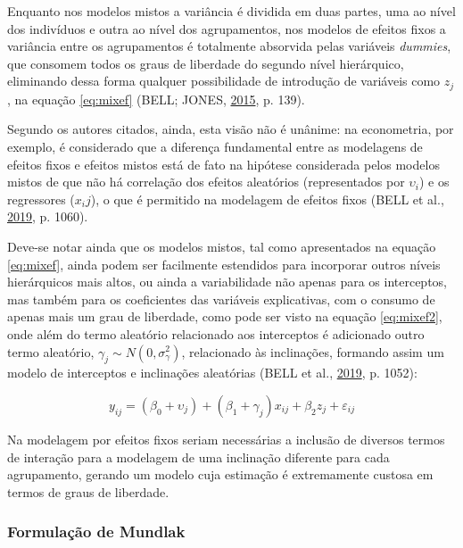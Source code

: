 \documentclass[
  a4paper, 11pt]{article}
\begin{document}
Enquanto nos modelos mistos a variância é dividida em duas partes, uma
ao nível dos indivíduos e outra ao nível dos agrupamentos, nos modelos
de efeitos fixos a variância entre os agrupamentos é totalmente
absorvida pelas variáveis \emph{dummies}, que consomem todos os graus de
liberdade do segundo nível hierárquico, eliminando dessa forma qualquer
possibilidade de introdução de variáveis como \(z_j\), na equação
\ref{eq:mixef} (BELL; JONES, \protect\hyperlink{ref-bell2015}{2015}, p.
139).

Segundo os autores citados, ainda, esta visão não é unânime: na
econometria, por exemplo, é considerado que a diferença fundamental
entre as modelagens de efeitos fixos e efeitos mistos está de fato na
hipótese considerada pelos modelos mistos de que não há correlação dos
efeitos aleatórios (representados por \(\upsilon_i\)) e os regressores
(\(x_ij\)), o que é permitido na modelagem de efeitos fixos (BELL et
al., \protect\hyperlink{ref-bell2019}{2019}, p. 1060).

Deve-se notar ainda que os modelos mistos, tal como apresentados na
equação \ref{eq:mixef}, ainda podem ser facilmente estendidos para
incorporar outros níveis hierárquicos mais altos, ou ainda a
variabilidade não apenas para os interceptos, mas também para os
coeficientes das variáveis explicativas, com o consumo de apenas mais um
grau de liberdade, como pode ser visto na equação \ref{eq:mixef2}, onde
além do termo aleatório relacionado aos interceptos é adicionado outro
termo aleatório, \(\gamma_j \sim N(0, \sigma^2_\gamma)\), relacionado às
inclinações, formando assim um modelo de interceptos e inclinações
aleatórias (BELL et al., \protect\hyperlink{ref-bell2019}{2019}, p.
1052):

\begin{equation} \label{eq:mixef2}
y_{ij} = (\beta_0 + \upsilon_j) + (\beta_1 + \gamma_j) x_{ij} + \beta_2 z_j + \varepsilon_{ij}
\end{equation}

Na modelagem por efeitos fixos seriam necessárias a inclusão de diversos
termos de interação para a modelagem de uma inclinação diferente para
cada agrupamento, gerando um modelo cuja estimação é extremamente
custosa em termos de graus de liberdade.

\hypertarget{formulauxe7uxe3o-de-mundlak}{%
\subsubsection{Formulação de
Mundlak}\label{formulauxe7uxe3o-de-mundlak}}
\end{document}
